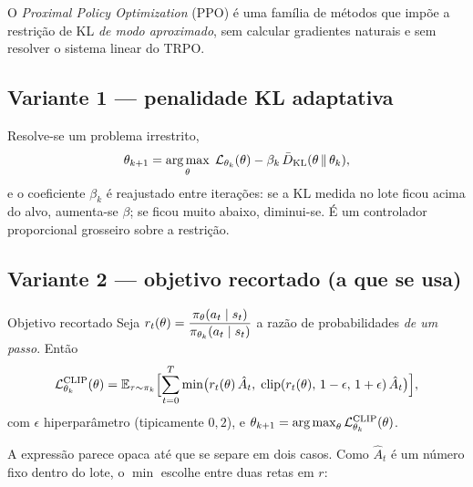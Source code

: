 \documentclass[11pt]{article}
\newcommand{\thv}{\theta}
\newcommand{\thk}{\thv_k}
\newcommand{\polth}{\pol_{\thv}}
\newcommand{\polk}{\pol_{k}}
\newcommand{\traj}{\tau}
\newcommand{\Ahat}{\hat{A}}
\newcommand{\Lsub}[1]{\mathcal{L}_{#1}}
\DeclareMathOperator{\clip}{clip}
\newcommand{\razao}{r_t(\thv)}
\newcommand{\Lclip}{\mathcal{L}^{\mathrm{CLIP}}}
\begin{document}
O \emph{Proximal Policy Optimization} (PPO) é uma família de métodos que impõe a
restrição de KL \emph{de modo aproximado}, sem calcular gradientes naturais e sem
resolver o sistema linear do TRPO.

\subsection{Variante 1 --- penalidade KL adaptativa}

Resolve-se um problema irrestrito,
\[
  \thv_{k+1} = \argmax_{\thv}\;\Lsub{\thk}(\thv)
    - \beta_k\,\bar D_{\mathrm{KL}}(\thv\,\|\,\thk),
\]
e o coeficiente $\beta_k$ é reajustado entre iterações: se a KL medida no lote ficou
acima do alvo, aumenta-se $\beta$; se ficou muito abaixo, diminui-se. É um controlador
proporcional grosseiro sobre a restrição.

\subsection{Variante 2 --- objetivo recortado (a que se usa)}

\begin{defbox}{Objetivo recortado}
  Seja $\razao = \dfrac{\polth(a_t\mid s_t)}{\pol_{\thk}(a_t\mid s_t)}$ a razão de
  probabilidades \emph{de um passo}. Então
  \[
    \Lclip_{\thk}(\thv) = \E_{\traj\sim\polk}\Bigl[\sum_{t=0}^{T}
      \min\bigl(\razao\,\Ahat_t,\;\clip(\razao,\,1-\epsilon,\,1+\epsilon)\,\Ahat_t\bigr)\Bigr],
  \]
  com $\epsilon$ hiperparâmetro (tipicamente $0{,}2$), e
  $\thv_{k+1} = \argmax_{\thv}\Lclip_{\thk}(\thv)$.
\end{defbox}

A expressão parece opaca até que se separe em dois casos. Como $\Ahat_t$ é um número
fixo dentro do lote, o $\min$ escolhe entre duas retas em $r$:
\end{document}
